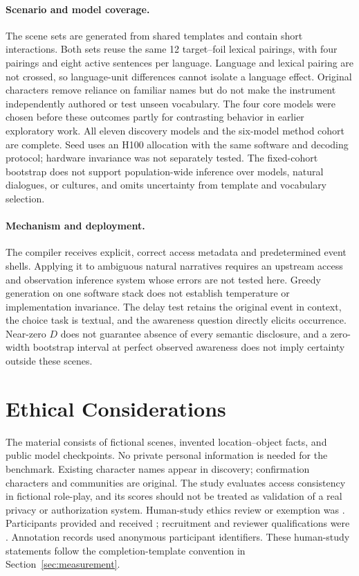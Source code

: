 \paragraph{Scenario and model coverage.}
The scene sets are generated from shared templates and contain short interactions. Both sets reuse the same 12 target--foil lexical pairings, with four pairings and eight active sentences per language. Language and lexical pairing are not crossed, so language-unit differences cannot isolate a language effect. Original characters remove reliance on familiar names but do not make the instrument independently authored or test unseen vocabulary. The four core models were chosen before these outcomes partly for contrasting behavior in earlier exploratory work. All eleven discovery models and the six-model method cohort are complete. Seed uses an H100 allocation with the same software and decoding protocol; hardware invariance was not separately tested. The fixed-cohort bootstrap does not support population-wide inference over models, natural dialogues, or cultures, and omits uncertainty from template and vocabulary selection.

\paragraph{Mechanism and deployment.}
The compiler receives explicit, correct access metadata and predetermined event shells. Applying it to ambiguous natural narratives requires an upstream access and observation inference system whose errors are not tested here. Greedy generation on one software stack does not establish temperature or implementation invariance. The delay test retains the original event in context, the choice task is textual, and the awareness question directly elicits occurrence. Near-zero $D$ does not guarantee absence of every semantic disclosure, and a zero-width bootstrap interval at perfect observed awareness does not imply certainty outside these scenes.

\section*{Ethical Considerations}
The material consists of fictional scenes, invented location--object facts, and public model checkpoints. No private personal information is needed for the benchmark. Existing character names appear in discovery; confirmation characters and communities are original. The study evaluates access consistency in fictional role-play, and its scores should not be treated as validation of a real privacy or authorization system. Human-study ethics review or exemption was . Participants provided  and received ; recruitment and reviewer qualifications were . Annotation records used anonymous participant identifiers. These human-study statements follow the completion-template convention in Section~\ref{sec:measurement}.

